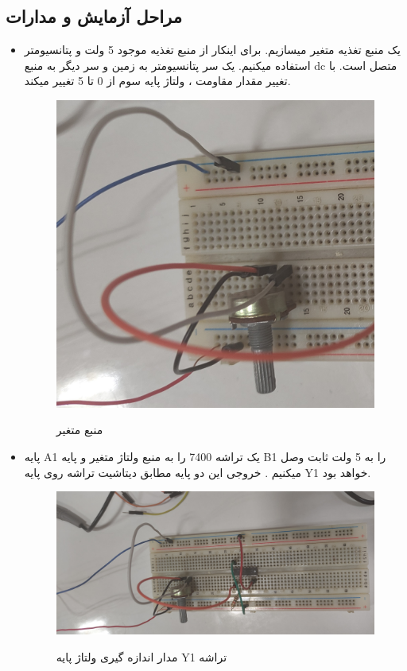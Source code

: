 \documentclass[twoside]{article}
\begin{document}
	\subsection*{مراحل آزمایش و مدارات}
	\begin{itemize}
		\item			
		یک منبع تغذیه متغیر میسازیم. برای اینکار از منبع تغذیه موجود 5 ولت و پتانسیومتر استفاده میکنیم. یک سر پتانسیومتر به زمین و سر دیگر به منبع dc متصل است. با تغییر مقدار مقاومت ، ولتاژ پایه سوم از 0 تا 5 تغییر میکند.
		
		\begin{figure}[h!]
			\begin{center}
				\includegraphics[scale=0.1]{variable_voltage_irl}‎
				\caption{منبع متغیر}
			\end{center}
		\end{figure} 
		
		\item			
		پایه A1 یک تراشه 7400 را به منبع ولتاژ متغیر و پایه B1 را به 5 ولت ثابت وصل میکنیم . خروجی این دو پایه مطابق دیتاشیت تراشه روی پایه Y1 خواهد بود. 
		
		\begin{figure}[h!]
			\begin{center}
				\includegraphics[scale=0.075]{first_madar_irl}‎
				\caption{مدار اندازه گیری ولتاژ پایه Y1 تراشه}
			\end{center}
		\end{figure} 
	

\end{itemize}
\end{document}
